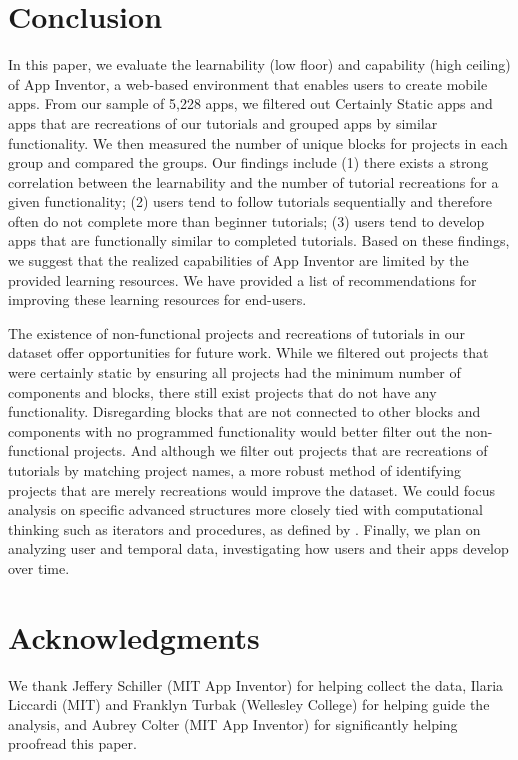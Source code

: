 \documentclass[conference]{IEEEtran}
\begin{document}


\section{Conclusion}
In this paper, we evaluate the learnability (low floor) and capability (high ceiling) of App Inventor, a web-based environment that enables users to create mobile apps. From our sample of 5,228 apps, we filtered out Certainly Static apps and apps that are recreations of our tutorials and grouped apps by similar functionality. We then measured the number of unique blocks for projects in each group and compared the groups. Our findings include (1) there exists a strong correlation between the learnability and the number of tutorial recreations for a given functionality; (2) users tend to follow tutorials sequentially and therefore often do not complete more than beginner tutorials; (3) users tend to develop apps that are functionally similar to completed tutorials. Based on these findings, we suggest that the realized capabilities of App Inventor are limited by the provided learning resources. We have provided a list of recommendations for improving these learning resources for end-users.

The existence of non-functional projects and recreations of tutorials in our dataset offer opportunities for future work. While we filtered out projects that were certainly static by ensuring all projects had the minimum number of components and blocks, there still exist projects that do not have any functionality. Disregarding blocks that are not connected to other blocks and components with no programmed functionality would better filter out the non-functional projects. And although we filter out projects that are recreations of tutorials by matching project names, a more robust method of identifying projects that are merely recreations would improve the dataset. We could focus analysis on specific advanced structures more closely tied with computational thinking such as iterators and procedures, as defined by \cite{paper:sherman}. Finally, we plan on analyzing user and temporal data, investigating how users and their apps develop over time.


\section*{Acknowledgments}
We thank Jeffery Schiller (MIT App Inventor) for helping collect the data, Ilaria Liccardi (MIT) and Franklyn Turbak (Wellesley College) for helping guide the analysis, and Aubrey Colter (MIT App Inventor) for significantly helping proofread this paper. 
\end{document}

